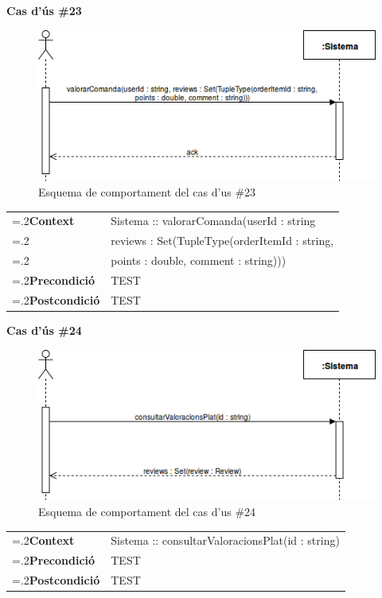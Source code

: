 \clearpage
\noindent\textbf{\large Cas d'ús \#23}\\
\begin{figure}[H]
\centering
\includegraphics[scale=0.6]{Figures/casdus_23.png}
\caption{Esquema de comportament del cas d'us \#23}
\end{figure}
\begin{table}[h]
\noindent
\begin{tabularx}{\linewidth}{
>{\hsize=.2\hsize}X%
>{\hsize=0.8\hsize}X%
}
\textbf{Context} 		& Sistema :: valorarComanda(userId : string\\
						& reviews : Set(TupleType(orderItemId : string, \\
						& points : double, comment : string))) \\
\textbf{Precondició} 	& TEST \\
\textbf{Postcondició}	& TEST \\
\end{tabularx}
\label{}
\end{table}

\noindent\textbf{\large Cas d'ús \#24}\\
\begin{figure}[H]
\centering
\includegraphics[scale=0.6]{Figures/casdus_24.png}
\caption{Esquema de comportament del cas d'us \#24}
\end{figure}
\begin{table}[h]
\noindent
\begin{tabularx}{\linewidth}{
>{\hsize=.2\hsize}X%
>{\hsize=0.8\hsize}X%
}
\textbf{Context} 		& Sistema :: consultarValoracionsPlat(id : string) \\
\textbf{Precondició} 	& TEST \\
\textbf{Postcondició}	& TEST \\
\end{tabularx}
\label{}
\end{table}

